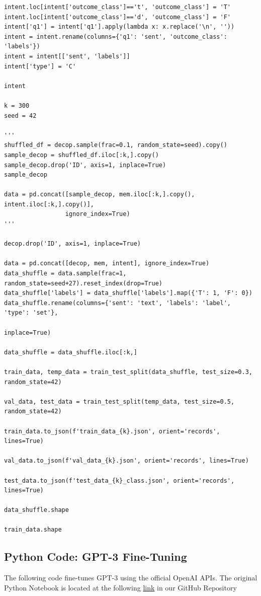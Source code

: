 \documentclass[10pt,twocolumn,letterpaper]{article}
\begin{document}
\begin{verbatim}
intent.loc[intent['outcome_class']=='t', 'outcome_class'] = 'T'
intent.loc[intent['outcome_class']=='d', 'outcome_class'] = 'F'
intent['q1'] = intent['q1'].apply(lambda x: x.replace('\n', ''))
intent = intent.rename(columns={'q1': 'sent', 'outcome_class': 'labels'})
intent = intent[['sent', 'labels']]
intent['type'] = 'C'

intent

k = 300
seed = 42

'''
shuffled_df = decop.sample(frac=0.1, random_state=seed).copy()
sample_decop = shuffled_df.iloc[:k,].copy()
sample_decop.drop('ID', axis=1, inplace=True)
sample_decop

data = pd.concat([sample_decop, mem.iloc[:k,].copy(), intent.iloc[:k,].copy()],
                 ignore_index=True)
'''

decop.drop('ID', axis=1, inplace=True)

data = pd.concat([decop, mem, intent], ignore_index=True)
data_shuffle = data.sample(frac=1, random_state=seed+27).reset_index(drop=True)
data_shuffle['labels'] = data_shuffle['labels'].map({'T': 1, 'F': 0})
data_shuffle.rename(columns={'sent': 'text', 'labels': 'label', 'type': 'set'}, 
                                                                        inplace=True)

data_shuffle = data_shuffle.iloc[:k,]

train_data, temp_data = train_test_split(data_shuffle, test_size=0.3, random_state=42)

val_data, test_data = train_test_split(temp_data, test_size=0.5, random_state=42)

train_data.to_json(f'train_data_{k}.json', orient='records', lines=True)

val_data.to_json(f'val_data_{k}.json', orient='records', lines=True)

test_data.to_json(f'test_data_{k}_class.json', orient='records', lines=True)

data_shuffle.shape

train_data.shape
\end{verbatim}

\subsection{Python Code: GPT-3 Fine-Tuning}

The following code fine-tunes GPT-3 using the official OpenAI APIs.
The original Python Notebook is located at the following \href{https://colab.research.google.com/github/TannerAGraves/GPT-LieDetection/blob/main/gpt3.5/API_scratch.ipynb}{link} in our GitHub Repository
\end{document}
